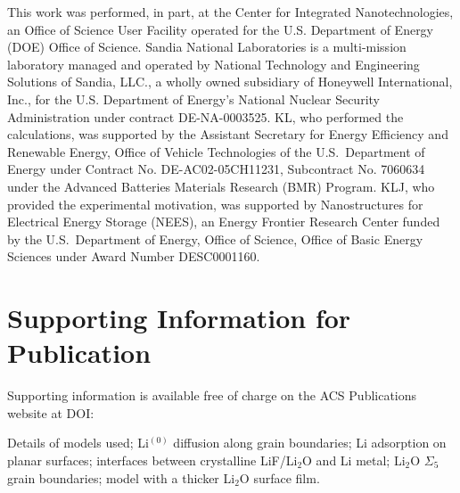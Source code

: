 \documentclass[prb,preprint,amsmath,amssymb]{revtex4}
\begin{document}
This work was performed, in part, at the Center for Integrated
Nanotechnologies, an Office of Science User Facility operated for the U.S.
Department of Energy (DOE) Office of Science. Sandia National Laboratories
is a multi-mission laboratory managed and operated by National Technology
and Engineering Solutions of Sandia, LLC., a wholly owned subsidiary of
Honeywell International, Inc., for the U.S. Department of Energy's National
Nuclear Security Administration under contract DE-NA-0003525.
KL, who performed the calculations, was supported by the Assistant Secretary
for Energy Efficiency and Renewable Energy, Office of Vehicle Technologies of
the U.S.~Department of Energy under Contract No. DE-AC02-05CH11231,
Subcontract No. 7060634 under the Advanced Batteries Materials Research (BMR)
Program.  KLJ, who provided the experimental motivation, was supported by
Nanostructures for Electrical Energy Storage (NEES), an Energy Frontier
Research Center funded by the U.S.~Department of Energy, Office of Science,
Office of Basic Energy Sciences under Award Number DESC0001160.

\section*{Supporting Information for Publication}
Supporting information is available free of charge on the ACS Publications
website at DOI: 

Details of models used; Li$^{(0)}$ diffusion along grain boundaries;
Li adsorption on planar surfaces; interfaces between crystalline
LiF/Li$_2$O and Li metal; Li$_2$O $\Sigma_5$ grain boundaries; model
with a thicker Li$_2$O surface film.

%
\end{document}
